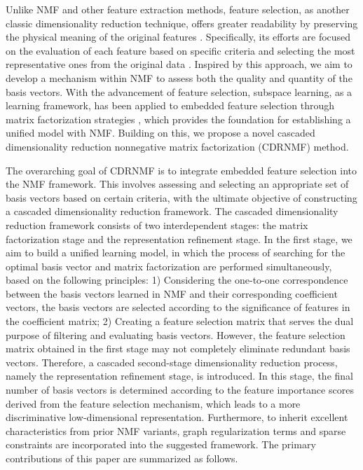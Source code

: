 \documentclass[a4paper,fleqn]{cas-sc}
\begin{document}
Unlike NMF and other feature extraction methods, feature selection, as another classic dimensionality reduction technique, offers greater readability by preserving the physical meaning of the original features \cite{57,54}. Specifically, its efforts are focused on the evaluation of each feature based on specific criteria and selecting the most representative ones from the original data \cite{55,56}. Inspired by this approach, we aim to develop a mechanism within NMF to assess both the quality and quantity of the basis vectors. With the advancement of feature selection, subspace learning, as a learning framework, has been applied to embedded feature selection through matrix factorization strategies \cite{27,28,52}, which provides the foundation for establishing a unified model with NMF. Building on this, we propose a novel cascaded dimensionality reduction nonnegative matrix factorization (CDRNMF) method.

The overarching goal of CDRNMF is to integrate embedded feature selection into the NMF framework. This involves assessing and selecting an appropriate set of basis vectors based on certain criteria, with the ultimate objective of constructing a cascaded dimensionality reduction framework.
The cascaded dimensionality reduction framework consists of two interdependent stages: the matrix factorization stage and the representation refinement stage. In the first stage, we aim to build a unified learning model, in which the process of searching for the optimal basis vector and matrix factorization are performed simultaneously, based on the following principles: 1) Considering the one-to-one correspondence between the basis vectors learned in NMF and their corresponding coefficient vectors, the basis vectors are selected according to the significance of features in the coefficient matrix; 2) Creating a feature selection matrix that serves the dual purpose of filtering and evaluating basis vectors.    However, the feature selection matrix obtained in the first stage may not completely eliminate redundant basis vectors. Therefore, a cascaded second-stage dimensionality reduction process, namely the representation refinement stage, is introduced. In this stage, the final number of basis vectors is determined according to the feature importance scores derived from the feature selection mechanism, which leads to a more discriminative low-dimensional representation.
Furthermore, to inherit excellent characteristics from prior NMF variants, graph regularization terms and sparse constraints are incorporated into the suggested framework. The primary contributions of this paper are summarized as follows.
\end{document}
